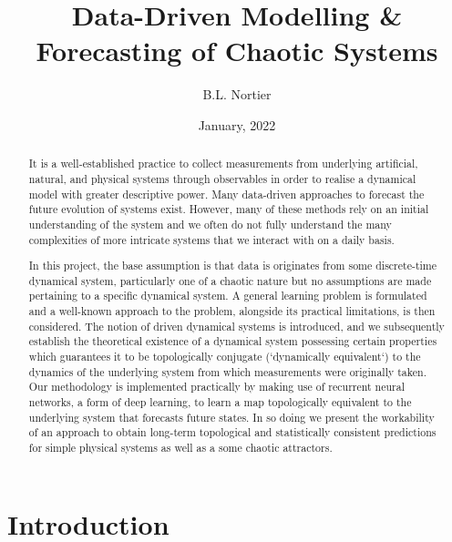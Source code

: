 \documentclass[a4paper,12pt,twoside]{report}
\begin{document}
\title{Data-Driven Modelling \& \\ Forecasting of Chaotic Systems}



\author{B.L. Nortier} 
\date{January, 2022}
\date{}
\maketitle


\begin{abstract}
  It is a well-established practice to collect measurements from underlying artificial, natural, and physical systems through observables in order to realise a dynamical model with greater descriptive power. 
  Many data-driven approaches to forecast the future evolution of systems exist. However, many of these methods rely on an initial understanding of the system and we often do not fully understand the many complexities of more intricate systems that we interact with on a daily basis.

  In this project, the base assumption is that data is originates from  some discrete-time dynamical system, particularly one of a chaotic nature but no assumptions are made pertaining to a specific dynamical system.
  A general learning problem is formulated and a well-known approach to the problem, alongside its practical limitations, is then considered.
  The notion of driven dynamical systems is introduced, and we subsequently establish the theoretical existence of a dynamical system possessing certain properties which guarantees it to be topologically conjugate (`dynamically equivalent`) to the dynamics of the underlying system from which measurements were originally taken. 
  Our methodology is implemented practically by making use of recurrent neural networks, a form of deep learning, to learn a map topologically equivalent to the underlying system that forecasts future states.
  In so doing we present the workability of an approach to obtain long-term topological and statistically consistent predictions for simple physical systems as well as a some chaotic attractors.
  \end{abstract}

  \tableofcontents

\chapter{Introduction}\label{ch1}
\end{document}
